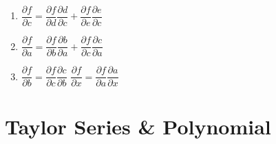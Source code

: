 \begin{enumerate}
\begin{multicols}{3}
\begin{enumerate}[leftmargin=0.1cm, label={}]
        \item[] $
            \dfrac{\partial f}{\partial c}
            = \dfrac{\partial f}{\partial d} \dfrac{\partial d}{\partial c}
            + \dfrac{\partial f}{\partial e} \dfrac{\partial e}{\partial c}
        $
        \item[] $
            \dfrac{\partial f}{\partial a}
            = \dfrac{\partial f}{\partial b} \dfrac{\partial b}{\partial a}
            + \dfrac{\partial f}{\partial c} \dfrac{\partial c}{\partial a}
        $
        \item[]
        $
            \dfrac{\partial f}{\partial b}
            = \dfrac{\partial f}{\partial c} \dfrac{\partial c}{\partial b}
        $
            \hspace{0.2cm}
            \vline
            \hspace{0.2cm}
        $
            \dfrac{\partial f}{\partial x}
            = \dfrac{\partial f}{\partial a} \dfrac{\partial a}{\partial x}
        $
    \end{enumerate}
    \end{multicols}
\end{enumerate}





\section{Taylor Series \& Polynomial}

